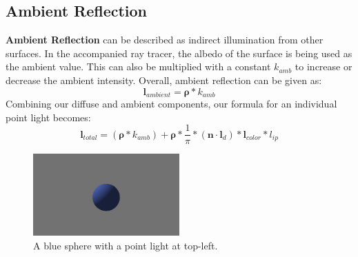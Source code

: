 \documentclass[11pt,a4paper]{article}
\begin{document}
	\subsection{Ambient Reflection}
	\textbf{Ambient Reflection} can be described as indirect illumination from other surfaces. In the accompanied ray tracer, the albedo of the surface is being used as the ambient value. This can also be multiplied with a constant $k_{amb}$ to increase or decrease the ambient intensity. Overall, ambient reflection can be given as:
	\begin{equation}
	\boldsymbol{l}_{ambient} = \boldsymbol{\rho} * k_{amb}
	\end{equation}
	Combining our diffuse and ambient components, our formula for an individual point light becomes:
	\begin{equation}
	\boldsymbol{l}_{total} = (\boldsymbol{\rho} * k_{amb}) + \boldsymbol{\rho} * \frac{1}{\pi} * (\boldsymbol{n} \cdot \boldsymbol{l}_{d}) * \boldsymbol{l}_{color} * l_{ip}
	\end{equation}
	\begin{figure}[H]
		\centering
		\captionsetup{justification=centering}
		\includegraphics[width=0.5\textwidth]{diffuse_ambient_reflection}\quad
		\caption{A blue sphere with a point light at top-left.}
	\end{figure}
\end{document}

